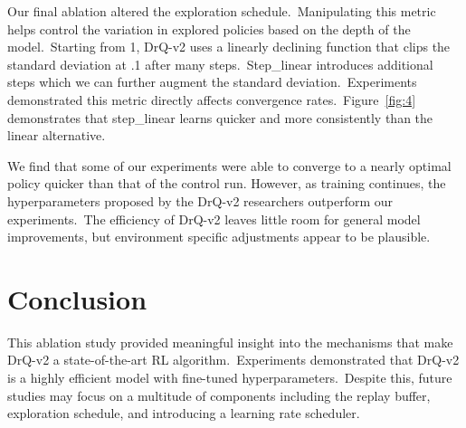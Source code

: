 \documentclass[conference]{./IEEEtran/IEEEtran} %
\begin{document}
    Our final ablation altered the exploration schedule.\ Manipulating this metric helps control the variation in explored policies
    based on the depth of the model.\ Starting from 1, DrQ-v2 uses a linearly declining function that clips the standard deviation
    at .1 after many steps.\ Step\_linear introduces additional steps which we can further augment the standard deviation.\ Experiments
    demonstrated this metric directly affects convergence rates.\ Figure~\ref{fig:4} demonstrates that step\_linear learns quicker
    and more consistently than the linear alternative.\

    We find that some of our experiments were able to converge to a nearly optimal policy quicker than that of the control run.
    However, as training continues, the hyperparameters proposed by the DrQ-v2 researchers outperform our experiments.\ The efficiency
    of DrQ-v2 leaves little room for general model improvements, but environment specific adjustments appear to be plausible.



    \section{Conclusion}\label{sec:conclusion}

    This ablation study provided meaningful insight into the mechanisms that make DrQ-v2 a state-of-the-art RL algorithm.\ Experiments
    demonstrated that DrQ-v2 is a highly efficient model with fine-tuned hyperparameters.\ Despite this, future studies may
    focus on a multitude of components including the replay buffer, exploration schedule, and introducing a learning rate scheduler.


    
    
\end{document}
